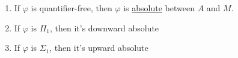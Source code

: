 \documentclass{article}
\begin{document}
\begin{remark}
  \leavevmode
  \begin{enumerate}[label=(\alph*)]
    \item If $\varphi$ is quantifier-free, then $\varphi$ is \hyperlink{def:abso}{absolute} between $A$ and $M$.
    \item If $\varphi$ is \hyperlink{def:sigmaPi}{$\Pi_1$}, then it's downward absolute
    \item If $\varphi$ is \hyperlink{def:sigmaPi}{$\Sigma_1$}, then it's upward absolute
  \end{enumerate}
\end{remark}
\printindex
\end{document}
